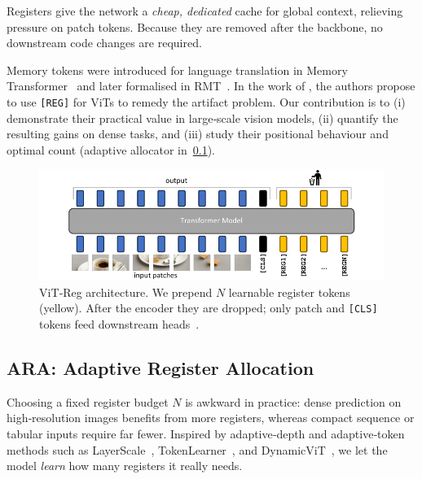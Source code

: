 \documentclass{article}
\newcommand{\RegTok}{\texttt{[REG]}\xspace}
\newcommand{\nreg}{N}
\newcommand{\citet}{\textcite}
\newcommand{\citep}{\parencite}
\begin{document}
Registers give the network a \emph{cheap, dedicated} cache for global context, relieving pressure on patch tokens.  
Because they are removed after the backbone, no downstream code changes are required.

Memory tokens were introduced for language translation in Memory Transformer~\citep{burtsevMemoryTransformer2021} and later formalised in RMT~\citep{bulatovRecurrentMemoryTransformer2022}.
In the work of \citet{darcetVisionTransformersNeed2024}, the authors propose to use \RegTok for ViTs to remedy the artifact problem.
Our contribution is to (i) demonstrate their practical value in large‑scale vision models, (ii) quantify the resulting gains on dense tasks, and (iii) study their positional behaviour and optimal count (adaptive allocator in \cref{sec:adaptive}).

\begin{figure}[t]
  \centering
  \includegraphics{resources/model.pdf}
  \caption{
    ViT‑Reg architecture.  
    We prepend $\nreg$ learnable register tokens (yellow).  
    After the encoder they are dropped; only patch and \texttt{[CLS]} tokens feed downstream heads \citep{darcetVisionTransformersNeed2024}.
    }
  \vspace{-1em}
  \label{fig:model}
\end{figure}



\subsection{ARA: Adaptive Register Allocation}
\label{sec:adaptive}

Choosing a fixed register budget $\nreg$ is awkward in practice: dense prediction on high‑resolution images benefits from more registers, whereas compact sequence or tabular inputs require far fewer.  
Inspired by adaptive‑depth and adaptive‑token methods such as LayerScale \citep{touvronGoingDeeperImage2021}, TokenLearner \citep{ryooTokenLearnerAdaptiveSpacetime2021}, and DynamicViT \citep{raoDynamicViTEfficientVision2021}, we let the model \emph{learn} how many registers it really needs.
\end{document}

